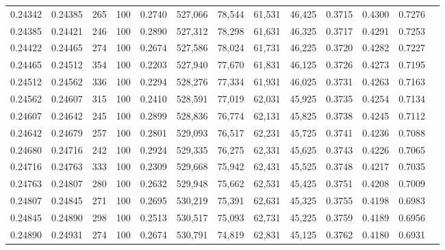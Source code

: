 \begin{tabular}{rrrrrrrrrrrrr}
0.24342 & 0.24385 &   265 & 100 &                                     0.2740 & 527,066 &  78,544 &  61,531 &  46,425 & 0.3715 & 0.4300 & 0.7276 \\
0.24385 & 0.24421 &   246 & 100 &                                     0.2890 & 527,312 &  78,298 &  61,631 &  46,325 & 0.3717 & 0.4291 & 0.7253 \\
0.24422 & 0.24465 &   274 & 100 &                                     0.2674 & 527,586 &  78,024 &  61,731 &  46,225 & 0.3720 & 0.4282 & 0.7227 \\
0.24465 & 0.24512 &   354 & 100 &                                     0.2203 & 527,940 &  77,670 &  61,831 &  46,125 & 0.3726 & 0.4273 & 0.7195 \\
0.24512 & 0.24562 &   336 & 100 &                                     0.2294 & 528,276 &  77,334 &  61,931 &  46,025 & 0.3731 & 0.4263 & 0.7163 \\
0.24562 & 0.24607 &   315 & 100 &                                     0.2410 & 528,591 &  77,019 &  62,031 &  45,925 & 0.3735 & 0.4254 & 0.7134 \\
0.24607 & 0.24642 &   245 & 100 &                                     0.2899 & 528,836 &  76,774 &  62,131 &  45,825 & 0.3738 & 0.4245 & 0.7112 \\
0.24642 & 0.24679 &   257 & 100 &                                     0.2801 & 529,093 &  76,517 &  62,231 &  45,725 & 0.3741 & 0.4236 & 0.7088 \\
0.24680 & 0.24716 &   242 & 100 &                                     0.2924 & 529,335 &  76,275 &  62,331 &  45,625 & 0.3743 & 0.4226 & 0.7065 \\
0.24716 & 0.24763 &   333 & 100 &                                     0.2309 & 529,668 &  75,942 &  62,431 &  45,525 & 0.3748 & 0.4217 & 0.7035 \\
0.24763 & 0.24807 &   280 & 100 &                                     0.2632 & 529,948 &  75,662 &  62,531 &  45,425 & 0.3751 & 0.4208 & 0.7009 \\
0.24807 & 0.24845 &   271 & 100 &                                     0.2695 & 530,219 &  75,391 &  62,631 &  45,325 & 0.3755 & 0.4198 & 0.6983 \\
0.24845 & 0.24890 &   298 & 100 &                                     0.2513 & 530,517 &  75,093 &  62,731 &  45,225 & 0.3759 & 0.4189 & 0.6956 \\
0.24890 & 0.24931 &   274 & 100 &                                     0.2674 & 530,791 &  74,819 &  62,831 &  45,125 & 0.3762 & 0.4180 & 0.6931 \\

\end{tabular}
